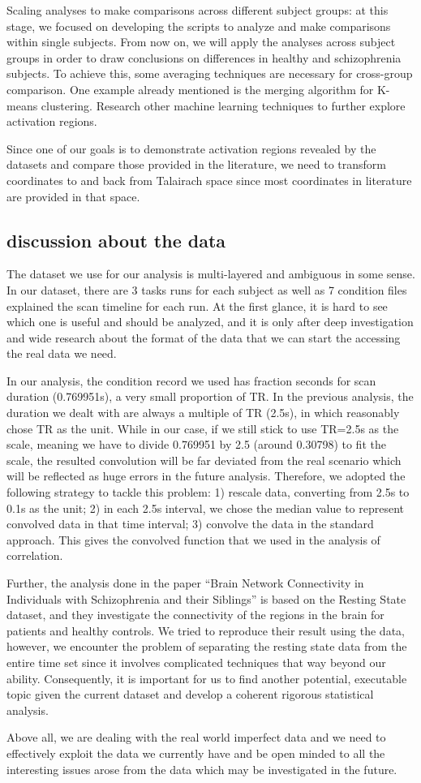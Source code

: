 \documentclass[11pt]{article}
\begin{document}
Scaling analyses to make comparisons across different subject groups: at this
stage, we focused on developing the scripts to analyze and make comparisons
within single subjects. From now on, we will apply the analyses across subject
groups in order to draw conclusions on differences in healthy and schizophrenia
subjects. To achieve this, some averaging techniques are necessary for
cross-group comparison. One example already mentioned is the merging algorithm
for K-means clustering. Research other machine learning techniques to further
explore activation regions.

Since one of our goals is to demonstrate activation regions revealed by the
datasets and compare those provided in the literature, we need to transform
coordinates to and back from Talairach space since most coordinates in
literature are provided in that space.

\subsection{discussion about the data}

The dataset we use for our analysis is multi-layered and ambiguous in some
sense. In our dataset, there are 3 tasks runs for each subject as well as 7
condition files explained the scan timeline for each run. At the first glance,
it is hard to see which one is useful and should be analyzed, and it is only
after deep investigation and wide research about the format of the data that we
can start the accessing the real data we need. 

In our analysis, the condition record we used has fraction seconds for scan
duration (0.769951s), a very small proportion of TR. In the previous analysis,
the duration we dealt with are always a multiple of TR (2.5s), in which
reasonably chose TR as the unit. While in our case, if we still stick to use
TR=2.5s as the scale, meaning we have to divide 0.769951 by 2.5 (around 
0.30798)
to fit the scale, the resulted convolution will be far deviated from the real
scenario which will be reflected as huge errors in the future
analysis. Therefore, we adopted the following strategy to tackle this problem:
1) rescale data, converting from 2.5s to 0.1s as the unit; 2) in each 2.5s
interval, we chose the median value to represent convolved data in that time
interval; 3) convolve the data in the standard approach. This gives the
convolved function that we used in the analysis of correlation. 

Further, the analysis done in the paper  “Brain Network Connectivity in
Individuals with Schizophrenia and their Siblings” is based on the Resting 
State
dataset, and they investigate the connectivity of the regions in the brain for
patients and healthy controls. We tried to reproduce their result using the
data, however, we encounter the problem of separating the resting state data
from the entire time set since it involves complicated techniques that way
beyond our ability. Consequently, it is important for us to find another
potential, executable topic given the current dataset and develop a coherent
rigorous statistical analysis.

Above all, we are dealing with the real world imperfect data and we need to
effectively exploit the data we currently have and be open minded to all the
interesting issues arose from the data which may be investigated in the future.


\end{document}
